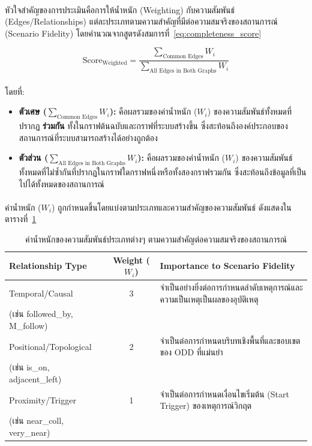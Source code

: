 \paragraph{}
หัวใจสำคัญของการประเมินคือการให้น้ำหนัก (Weighting) กับความสัมพันธ์ (Edges/Relationships) แต่ละประเภทตามความสำคัญที่มีต่อความสมจริงของสถานการณ์ (Scenario Fidelity) โดยคำนวณจากสูตรดังสมการที่~\ref{eq:completeness_score}

\begin{equation}
    \text{Score}_{\text{Weighted}} = \frac{\sum_{\text{Common Edges}} W_i}{\sum_{\text{All Edges in Both Graphs}} W_i}
    \label{eq:completeness_score}
\end{equation}

\paragraph{}
โดยที่:
\begin{itemize}
    \item \textbf{ตัวเศษ ($\sum_{\text{Common Edges}} W_i$):} คือผลรวมของค่าน้ำหนัก ($W_i$) ของความสัมพันธ์ทั้งหมดที่ปรากฏ \textbf{ร่วมกัน} ทั้งในกราฟต้นฉบับและกราฟที่ระบบสร้างขึ้น ซึ่งสะท้อนถึงองค์ประกอบของสถานการณ์ที่ระบบสามารถสร้างได้อย่างถูกต้อง
    \item \textbf{ตัวส่วน ($\sum_{\text{All Edges in Both Graphs}} W_i$):} คือผลรวมของค่าน้ำหนัก ($W_i$) ของความสัมพันธ์ทั้งหมดที่ไม่ซ้ำกันที่ปรากฏในกราฟใดกราฟหนึ่งหรือทั้งสองกราฟรวมกัน ซึ่งสะท้อนถึงข้อมูลที่เป็นไปได้ทั้งหมดของสถานการณ์
\end{itemize}

\paragraph{}
ค่าน้ำหนัก ($W_i$) ถูกกำหนดขึ้นโดยแบ่งตามประเภทและความสำคัญของความสัมพันธ์ ดังแสดงในตารางที่~\ref{tab:relationship_weights}

\begin{table}[htbp]
    \centering
    \caption{ค่าน้ำหนักของความสัมพันธ์ประเภทต่างๆ ตามความสำคัญต่อความสมจริงของสถานการณ์}
    \label{tab:relationship_weights}
    \begin{tabular}{|l|c|p{7cm}|}
        \hline
        \rowcolor{gray!20} \textbf{Relationship Type} & \textbf{Weight ($W_i$)} & \textbf{Importance to Scenario Fidelity} \\
        \hline
        Temporal/Causal & 3 & จำเป็นอย่างยิ่งต่อการกำหนดลำดับเหตุการณ์และความเป็นเหตุเป็นผลของอุบัติเหตุ \\
        (เช่น followed\_by, M\_follow) & & \\
        \hline
        Positional/Topological & 2 & จำเป็นต่อการกำหนดบริบทเชิงพื้นที่และขอบเขตของ ODD ที่แม่นยำ \\
        (เช่น is\_on, adjacent\_left) & & \\
        \hline
        Proximity/Trigger & 1 & จำเป็นต่อการกำหนดเงื่อนไขเริ่มต้น (Start Trigger) ของเหตุการณ์วิกฤต \\
        (เช่น near\_coll, very\_near) & & \\
        \hline
    \end{tabular}
\end{table}

